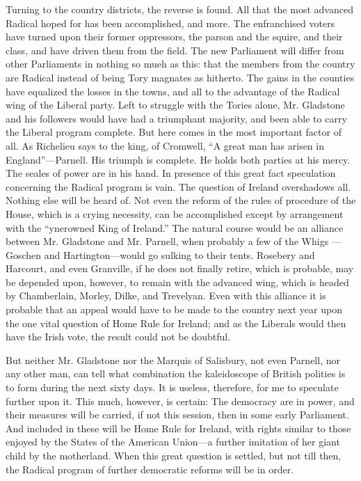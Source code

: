 \documentclass[11pt,openany]{book}
\begin{document}
Turning to the country districts, the reverse is found. All that the most advanced Radical hoped for has been accomplished, and more. The enfranchised voters have turned upon their former oppressors, the parson and the squire, and their class, and have driven them from the field. The new Parliament will differ from other Parliaments in nothing so mueh as this: that the members from the country are Radical instead of being Tory magnates as hitherto. The gains in the counties have equalized the losses in the towns, and all to the advantage of the Radical wing of the Liberal party. Left to struggle with the Tories alone, Mr. Gladstone and his followers would have had a triumphant majority, and been able to carry the Liberal program complete. But here comes in the most important factor of all. As Richelieu says to the king, of Cromwell, ``A great man has arisen in England''---Parnell. His triumph is complete. He holds both parties at his mercy. The seales of power are in his hand. In presence of this great fact speculation concerning the Radical program is vain. The question of Ireland overshadows all. Nothing else will be heard of. Not even the reform of the rules of procedure of the House, which is a crying necessity, can be accomplished except by arrangement with the ``ynerowned King of Ireland.'' The natural course would be an alliance between Mr. Gladstone and Mr. Parnell, when probably a few of the Whigs --- Goschen and Hartington---would go sulking to their tents. Rosebery and Harcourt, and even Granville, if he does not finally retire, which is probable, may be depended upon, however, to remain with the advanced wing, which is headed by Chamberlain, Morley, Dilke, and Trevelyan. Even with this alliance it is probable that an appeal would have to be made to the country next year upon the one vital question of Home Rule for Ireland; and as the Liberals would then have the Irish vote, the result could not be doubtful.

But neither Mr. Gladstone nor the Marquis of Salisbury, not even Parnell, nor any other man, can tell what combination the kaleidoscope of British polities is to form during the next sixty days. It is useless, therefore, for me to speculate further upon it. This much, however, is certain: The democracy are in power, and their measures will be carried, if not this session, then in some early Parliament. And included in these will be Home Rule for Ireland, with rights similar to those enjoyed by the States of the American Union---a further imitation of her giant child by the motherland. When this great question is settled, but not till then, the Radical program of further democratic reforms will be in order.
\end{document}
